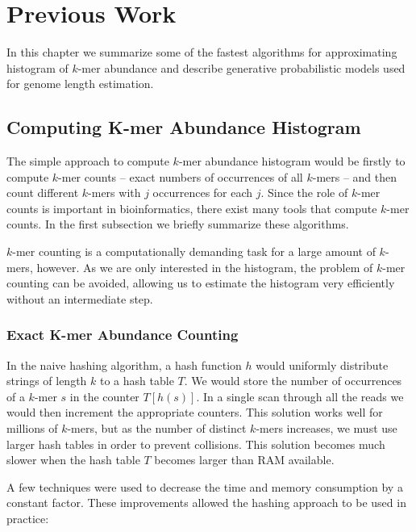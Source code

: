 \chapter{Previous Work}

In this chapter we summarize some of the fastest algorithms for approximating histogram of $k$-mer abundance 
and describe generative probabilistic models used for genome length estimation.

\section{Computing K-mer Abundance Histogram}
\label{sec:algorithms}

The simple approach to compute $k$-mer abundance histogram would be firstly to compute $k$-mer counts --
exact numbers of occurrences of all $k$-mers -- and then count different $k$-mers with $j$ occurrences for each $j$.
Since the role of $k$-mer counts is important in bioinformatics, there exist many tools that
compute $k$-mer counts. In the first subsection we briefly summarize these algorithms.

$k$-mer counting is a computationally demanding task for a large amount of $k$-mers, however.
As we are only interested in the histogram, the problem of $k$-mer counting can be avoided,
allowing us to estimate the histogram very efficiently without an intermediate step.

\subsection{Exact K-mer Abundance Counting}
\label{sec:exact-algorithms}
In the naive hashing algorithm, a hash function $h$ would uniformly distribute strings of length $k$ to a hash table $T$. 
We would store the number of occurrences of a $k$-mer $s$ in the counter $T[h(s)]$. In a single scan through all the reads we
would then increment the appropriate counters. This solution works well for millions of $k$-mers, but as
the number of distinct $k$-mers increases, we must use larger hash tables in order to prevent collisions.
This solution becomes much slower when the hash table $T$ becomes larger than RAM available.

A few techniques were used to decrease the time and memory consumption by a constant factor. 
These improvements allowed the hashing approach to be used in practice:

